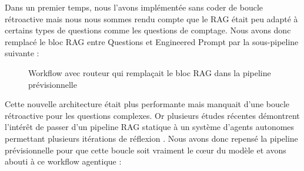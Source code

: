 Dans un premier temps, nous l’avons implémentée sans coder de boucle rétroactive mais nous nous sommes rendu compte que le RAG était peu adapté à certains types de questions comme les questions de comptage. Nous avons donc remplacé le bloc RAG entre Questions et Engineered Prompt par la sous-pipeline suivante :


\begin{figure}[H]
\begin{center}
\end{center}
\caption{Workflow avec routeur qui remplaçait le bloc RAG dans la pipeline prévisionnelle}
\end{figure}

Cette nouvelle architecture était plus performante mais manquait d’une boucle rétroactive pour les questions complexes. Or plusieurs études récentes démontrent l'intérêt de passer d'un pipeline RAG statique à un système d'agents autonomes permettant plusieurs itérations de réflexion \cite{Singh2025} \cite{Liang2025}. Nous avons donc repensé la pipeline prévisionnelle pour que cette boucle soit vraiment le cœur du modèle et avons abouti à ce workflow agentique : 

